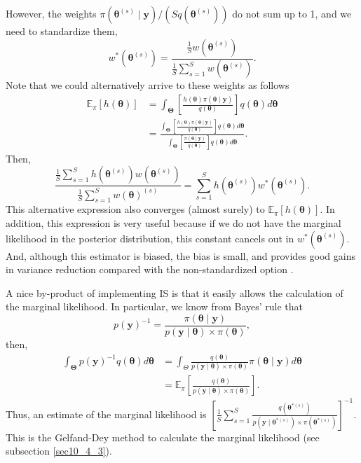 However, the weights $\pi(\bm{\theta}^{(s)}\mid \bm{y})/(Sq(\bm{\theta}^{(s)}))$ do not sum up to 1, and we need to standardize them, 
$$w^*(\bm{\theta}^{(s)})=\frac{\frac{1}{S} w(\bm{\theta}^{(s)})}{\frac{1}{S}\sum_{s=1}^Sw(\bm{\theta}^{(s)})}.$$
Note that we could alternatively arrive to these weights as follows 
\begin{align*}\label{eq5_4}
	\mathbb{E}_{\pi}[h(\bm{\theta})]&=\int_{\bm{\Theta}} \left[\frac{h(\bm{\theta}) \pi(\bm{\theta}\mid \bm{y})}{q(\bm{\theta})}\right]q(\bm{\theta})d\bm{\theta}\\
	&=\frac{\int_{\bm{\Theta}}\left[\frac{h(\bm{\theta}) \pi(\bm{\theta}\mid \bm{y})}{q(\bm{\theta})}\right] q(\bm{\theta})d\bm{\theta}}{\int_{\bm{\Theta}}\left[\frac{ \pi(\bm{\theta}\mid \bm{y})}{q(\bm{\theta})}\right] q(\bm{\theta})d\bm{\theta}}.
\end{align*}
Then, $$\frac{\frac{1}{S}\sum_{s=1}^Sh(\bm{\theta}^{(s)})w(\bm{\theta}^{(s)})}{\frac{1}{S}\sum_{s=1}^Sw(\bm{\theta})^{(s)}}= \sum_{s=1}^S h(\bm{\theta}^{(s)})w^*(\bm{\theta}^{(s)}).$$ This alternative expression also converges (almost surely) to $\mathbb{E}_{\pi}[h(\bm{\theta})]$.  In addition, this expression is very useful because if we do not have the marginal likelihood in the posterior distribution, this constant cancels out in $w^*(\bm{\theta}^{(s)})$. And, although this estimator is biased, the bias is small, and provides good gains in variance reduction compared with the non-standardized option \cite[Chap.~3]{robert2011monte}.

A nice by-product of implementing IS is that it easily allows the calculation of the marginal likelihood. In particular, we know from Bayes' rule that
$$p(\bm{y})^{-1}=\frac{\pi(\bm{\theta}\mid \bm{y})}{p(\bm{y}\mid \bm{\theta})\times \pi(\bm{\theta})},$$
then, 
\begin{align*}
	\int_{\bm{\Theta}}p(\bm{y})^{-1}q(\bm{\theta})d\bm{\theta}&=\int_{{\Theta}}\frac{q(\bm{\theta})}{p(\bm{y}\mid \bm{\theta})\times \pi(\bm{\theta})}\pi(\bm{\theta}\mid \bm{y})d\bm{\theta}\\
	&=\mathbb{E}_{\pi}\left[\frac{q(\bm{\theta})}{p(\bm{y}\mid \bm{\theta})\times \pi(\bm{\theta})}\right].
\end{align*}
Thus, an estimate of the marginal likelihood is $\left[\frac{1}{S}\sum_{s=1}^S\frac{q(\bm{\theta}^{*(s)})}{p(\bm{y}\mid \bm{\theta}^{*(s)})\times\pi(\bm{\theta}^{*(s)})}\right]^{-1}$. This is the Gelfand-Dey method to calculate the marginal likelihood \cite{gelfand1994bayesian} (see subsection \ref{sec10_4_3}).\\

